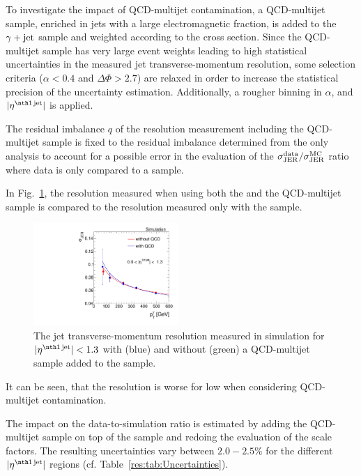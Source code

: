 To investigate the impact of QCD-multijet contamination, a QCD-multijet sample, enriched in jets with a large electromagnetic fraction, is added to the $\gamma + \text{jet}$ sample and weighted according to the cross section.
Since the QCD-multijet sample has very large event weights leading to high statistical uncertainties in the measured jet transverse-momentum resolution, some selection criteria ($\alpha<0.4$ and $\Delta\Phi>2.7$) are relaxed in order to increase the statistical precision of the uncertainty estimation.
Additionally, a rougher binning in $\alpha$, \ptgamma and $|\etafirstjet|$ is applied.

The residual imbalance $q$ of the resolution measurement including the QCD-multijet sample is fixed to the residual imbalance determined from the \GAMJET only analysis to account for a possible error in the evaluation of the $\sigma_\mathrm{JER}^{\text{data}}/\sigma_\mathrm{JER}^{\text{MC}}$ ratio where data is only compared to a \GAMJET sample.

In Fig.~\ref{res:fig:QCDuncertainty}, the resolution measured when using both the \GAMJET and the QCD-multijet sample is compared to the resolution measured only with the \GAMJET sample.
\begin{figure}[t]
  \centering
      \includegraphics[width=0.49\textwidth]{figures/resolution/systematicUncertainties/Resolution_for_1_eta_bin_QCDUncertainty_RMS99.pdf}
  \caption{The jet transverse-momentum resolution measured in simulation for $|\etafirstjet| < 1.3$ with (blue) and without (green) a QCD-multijet sample added to the \GAMJET sample.}  
  \label{res:fig:QCDuncertainty}
\end{figure}
It can be seen, that the resolution is worse for low \ptgamma when considering QCD-multijet contamination.

The impact on the data-to-simulation ratio is estimated by adding the QCD-multijet sample on top of the \GAMJET sample and redoing the evaluation of the scale factors.
The resulting uncertainties vary between $2.0-2.5\%$ for the different $|\etafirstjet|$ regions (cf. Table~\ref{res:tab:Uncertainties}).

